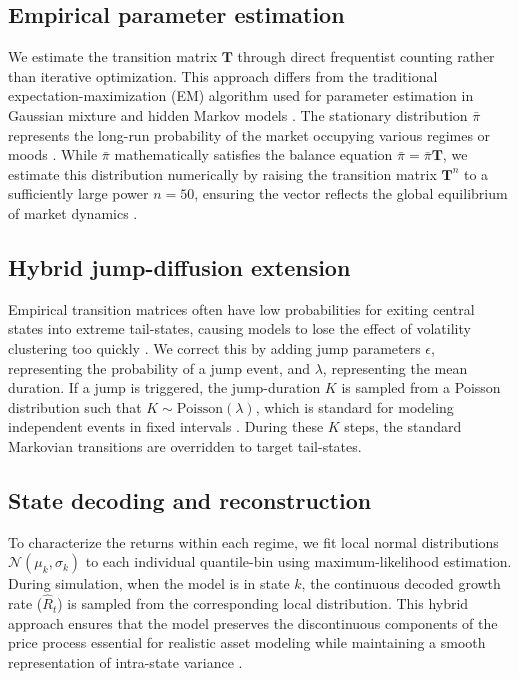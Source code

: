 \documentclass[11pt, letterpaper]{article}
\begin{document}
\subsection{Empirical parameter estimation}
We estimate the transition matrix $\mathbf{T}$ through direct frequentist counting rather than iterative optimization. This approach differs from the traditional expectation-maximization (EM) algorithm used for parameter estimation in Gaussian mixture and hidden Markov models \cite{bilmes_gentle_nodate}. The stationary distribution $\bar{\pi}$ represents the long-run probability of the market occupying various regimes or moods \cite{hamilton_regime_2018}. While $\bar{\pi}$ mathematically satisfies the balance equation $\bar{\pi} = \bar{\pi}\mathbf{T}$, we estimate this distribution numerically by raising the transition matrix $\mathbf{T}^n$ to a sufficiently large power $n =50$, ensuring the vector reflects the global equilibrium of market dynamics \cite{grinstead_introduction_1997}.

\subsection{Hybrid jump-diffusion extension}
Empirical transition matrices often have low probabilities for exiting central states into extreme tail-states, causing models to lose the effect of volatility clustering too quickly \cite{bulla_stylized_2006}. We correct this by adding jump parameters $\epsilon$, representing the probability of a jump event, and $\lambda$, representing the mean duration. If a jump is triggered, the jump-duration $K$ is sampled from a Poisson distribution such that $K \sim \text{Poisson}(\lambda)$, which is standard for modeling independent events in fixed intervals \cite{glasserman_monte_2003}. During these $K$ steps, the standard Markovian transitions are overridden to target tail-states.

\subsection{State decoding and reconstruction}
To characterize the returns within each regime, we fit local normal distributions $\mathcal{N}(\mu_k, \sigma_k)$ to each individual quantile-bin using maximum-likelihood estimation. During simulation, when the model is in state $k$, the continuous decoded growth rate ($\hat{R}_t$) is sampled from the corresponding local distribution. This hybrid approach ensures that the model preserves the discontinuous components of the price process essential for realistic asset modeling while maintaining a smooth representation of intra-state variance \cite{kou_jump-diffusion_2002}.
\end{document}

